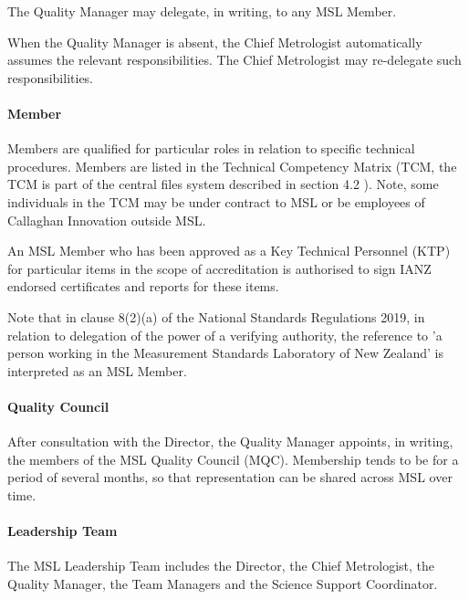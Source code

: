 The Quality Manager may delegate, in writing, to any MSL Member.

When the Quality Manager is absent, the Chief Metrologist automatically assumes the relevant responsibilities.  The Chief Metrologist may re-delegate such responsibilities. 
%
\paragraph{Member}
Members are qualified for particular roles in relation to specific technical procedures. Members are listed in the Technical Competency Matrix (TCM, the TCM is part of the central files system described in section 4.2 ). Note, some individuals in the TCM may be under contract to MSL or be employees of Callaghan Innovation outside MSL. 

An MSL Member who has been approved as a Key Technical Personnel (KTP) for particular items in the scope of accreditation is authorised to sign IANZ endorsed certificates and reports for these items.


{Note that in clause 8(2)(a) of the National Standards Regulations 2019, in relation to delegation of the power of a verifying authority, the reference to 'a person working in the Measurement Standards Laboratory of New Zealand' is interpreted as an MSL Member.}

\paragraph{Quality Council}
After consultation with the Director, the Quality Manager appoints, in writing, the members of the MSL Quality Council (MQC). Membership tends to be for a period of several months, so that representation can be shared across MSL over time.

\paragraph{Leadership Team}
The MSL Leadership Team includes the Director, the Chief Metrologist, the Quality Manager, the 
Team Managers and the Science Support Coordinator. 

